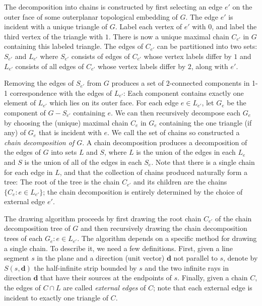 \documentclass[orivec]{llncs}
\begin{document}
The decomposition into chains is constructed by first selecting an edge $e'$ on the outer face of some outerplanar topological embedding of $G$. The edge $e'$ is incident with a unique triangle of $G$.  Label each vertex of $e'$ with $0$, and label the third vertex of the
triangle with $1$.
There is now a unique maximal chain $C_{e'}$ in $G$ containing this labeled triangle.
The edges of $C_{e'}$ can be partitioned into two sets: $S_{e'}$ and $L_{e'}$ where
$S_{e'}$ consists of edges of $C_{e'}$ whose vertex labels differ by $1$ and
$L_{e'}$ consists of all edges of $C_{e'}$ whose vertex labels differ by $2$, along with $e'$.

%

Removing the edges of $S_{e'}$ from $G$ produces a set of $2$-connected components in 1-1 correspondence with the edges of  $L_{e'}$: Each component contains exactly one element of  $L_{e'}$ which lies on its outer face.
For each edge $e \in L_{e'}$, let $G_e$ be the component of $G -  S_{e'}$ containing $e$.
We can then recursively decompose each $G_e$ by choosing the (unique) maximal chain $C_e$ in $G_e$ containing the one triangle (if any) of $G_e$ that is incident with $e$. We call the set of chains so constructed a {\em chain decomposition of $G$}. A chain decomposition produces  a decomposition of the edges of $G$ into sets $L$ and $S$, where $L$ is the union of the edges
in each $L_e$ and $S$ is the union of all of the edges in each $S_e$.
Note that there is a single chain for each edge in $L$, and that the collection of chains produced naturally form a tree: The root of the tree is the chain $C_{e'}$ and its children are the chains $\{C_e : e \in L_{e'}\}$; the chain decomposition is entirely determined by the choice of external
edge $e'$.

The drawing algorithm proceeds by first drawing the root chain $C_{e'}$ of the chain decomposition tree of $G$ and then recursively drawing the chain decomposition trees of each $G_e : e \in L_{e'}$. The algorithm depends on a specific method for drawing a single chain. To describe it, we need a few definitions. First, given a line segment $s$ in the plane and a direction
(unit vector) $\mathbf{d}$ not parallel to $s$, denote by $S(s,\mathbf{d})$ the half-infinite strip bounded by $s$ and the two infinite rays in direction $\mathbf{d}$ that have their sources at the endpoints of $s$.  Finally, given a chain $C$, the edges of $C \cap L$ are called {\em external edges} of $C$; note that each external edge is incident to exactly one triangle of $C$.
\end{document}
